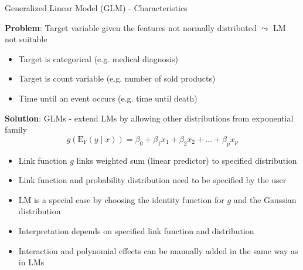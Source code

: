 \documentclass[11pt,compress,t,notes=noshow, aspectratio=169, xcolor=table]{beamer}
\begin{document}
\begin{frame}{Generalized Linear Model (GLM) - Characteristics}

\textbf{Problem}: Target variable given the features not normally distributed $\leadsto$ LM not suitable
\begin{itemize}
    \item Target is categorical (e.g. medical diagnosis)
    \item Target is count variable (e.g. number of sold products)
    \item Time until an event occurs (e.g. time until death)
\end{itemize}
\medskip
\pause
\textbf{Solution}: GLMs - extend LMs by allowing other distributions from exponential family
$$g(\mathrm{E}_Y (y\mid x)) = \beta_0 + \beta_1 x_1 + \beta_2 x_2 + \ldots + \beta_p x_p$$
\vspace*{-0.4cm}
    \begin{itemize}
        \item Link function $g$ links weighted sum (linear predictor) to specified distribution
        \item Link function and probability distribution need to be specified by the user
        \item LM is a special case by choosing the identity function for $g$ and the Gaussian distribution
        \item Interpretation depends on specified link function and distribution
        \item Interaction and polynomial effects can be manually added in the same way as in LMs
    \end{itemize}
    
    
    
    
\end{frame}
 	
\end{document}
